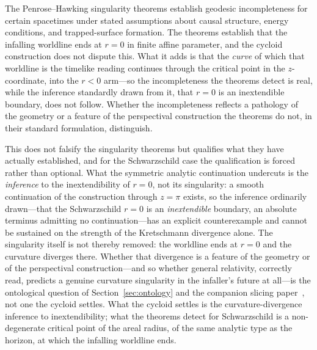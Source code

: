 \documentclass[11pt,a4paper]{article}
\theoremstyle{definition}
\begin{document}
The Penrose--Hawking singularity theorems \cite{penrose1965,hawking1970} establish geodesic incompleteness for certain spacetimes under stated assumptions about causal structure, energy conditions, and trapped-surface formation. The theorems establish that the infalling worldline ends at $r=0$ in finite affine parameter, and the cycloid construction does not dispute this. What it adds is that the \emph{curve} of which that worldline is the timelike reading continues through the critical point in the $z$-coordinate, into the $r<0$ arm---so the incompleteness the theorems detect is real, while the inference standardly drawn from it, that $r=0$ is an inextendible boundary, does not follow. Whether the incompleteness reflects a pathology of the geometry or a feature of the perspectival construction the theorems do not, in their standard formulation, distinguish.

This does not falsify the singularity theorems but qualifies what they have actually established, and for the Schwarzschild case the qualification is forced rather than optional. What the symmetric analytic continuation undercuts is the \emph{inference} to the inextendibility of $r=0$, not its singularity: a smooth continuation of the construction through $z=\pi$ exists, so the inference ordinarily drawn---that the Schwarzschild $r=0$ is an \emph{inextendible} boundary, an absolute terminus admitting no continuation---has an explicit counterexample and cannot be sustained on the strength of the Kretschmann divergence alone. The singularity itself is not thereby removed: the worldline ends at $r=0$ and the curvature diverges there. Whether that divergence is a feature of the geometry or of the perspectival construction---and so whether general relativity, correctly read, predicts a genuine curvature singularity in the infaller's future at all---is the ontological question of Section~\ref{sec:ontology} and the companion slicing paper~\cite{JanzenSlicing}, not one the cycloid settles. What the cycloid settles is the curvature-divergence inference to inextendibility; what the theorems detect for Schwarzschild is a non-degenerate critical point of the areal radius, of the same analytic type as the horizon, at which the infalling worldline ends.
\end{document}
